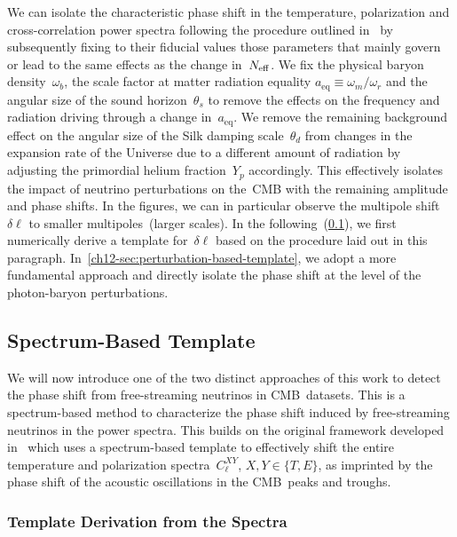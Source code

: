 We can isolate the characteristic phase shift in the temperature, polarization and cross-correlation power spectra following the procedure outlined in~\cite{Follin:2015hya, Wallisch:2018rzj} by subsequently fixing to their fiducial values those parameters that mainly govern or lead to the same effects as the change in~$N_\mathrm{eff}$. We fix the physical baryon density~$\omega_b$, the scale factor at matter radiation equality $a_\mathrm{eq} \equiv \omega_m/\omega_r$ and the angular size of the sound horizon~$\theta_s$ to remove the effects on the frequency and radiation driving through a change in~$a_\mathrm{eq}$. We remove the remaining background effect on the angular size of the Silk damping scale~$\theta_d$ from changes in the expansion rate of the Universe due to a different amount of radiation by adjusting the primordial helium fraction~$Y_p$ accordingly. This effectively isolates the impact of neutrino perturbations on the~CMB with the remaining amplitude and phase shifts. In the figures, we can in particular observe the multipole shift~$\delta\ell$ to smaller multipoles~(larger scales). In the following~(\textsection\ref{ch12-sec:spectrum-based-template}), we first numerically derive a template for~$\delta\ell$ based on the procedure laid out in this paragraph. In~\textsection\ref{ch12-sec:perturbation-based-template}, we adopt a more fundamental approach and directly isolate the phase shift at the level of the photon-baryon perturbations.


\subsection{Spectrum-Based Template}
\label{ch12-sec:spectrum-based-template}

We will now introduce one of the two distinct approaches of this work to detect the phase shift from free-streaming neutrinos in CMB~datasets. This is a spectrum-based method to characterize the phase shift induced by free-streaming neutrinos in the power spectra. This builds on the original framework developed in~\cite{Follin:2015hya} which uses a spectrum-based template to effectively shift the entire temperature and polarization spectra~$C_\ell^{XY}$, $X,Y \in \{T, E\}$, as imprinted by the phase shift of the acoustic oscillations in the CMB~peaks and troughs.


\subsubsection{Template Derivation from the Spectra}
\label{ch12-sec:spectrum-template}

